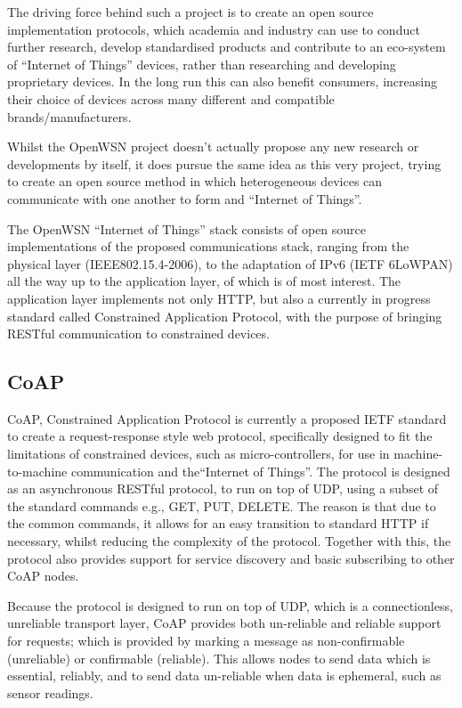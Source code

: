 The driving force behind such a project is to create an open source implementation protocols, which academia and industry can use to conduct further research, develop standardised products and contribute to an eco-system of ``Internet of Things'' devices, rather than researching and developing proprietary devices. In the long run this can also benefit consumers, increasing their choice of devices across many different and compatible brands/manufacturers.

Whilst the OpenWSN project doesn't actually propose any new research or developments by itself, it does pursue the same idea as this very project, trying to create an open source method in which heterogeneous devices can communicate with one another to form and ``Internet of Things''.

The OpenWSN ``Internet of Things'' stack consists of open source implementations of the proposed communications stack, ranging from the physical layer (IEEE802.15.4-2006), to the adaptation of IPv6 (IETF 6LoWPAN) all the way up to the application layer, of which is of most interest. The application layer implements not only HTTP, but also a currently in progress standard called Constrained Application Protocol, with the purpose of bringing RESTful communication to constrained devices.



\subsection{CoAP} %
\label{sub:coap}
CoAP, Constrained Application Protocol is currently a proposed IETF standard to create a request-response style web protocol, specifically designed to fit the limitations of constrained devices, such as micro-controllers, for use in machine-to-machine communication and the``Internet of Things''. The protocol is designed as an asynchronous RESTful protocol, to run on top of UDP, using a subset of the standard commands e.g., GET, PUT, DELETE. The reason is that due to the common commands, it allows for an easy transition to standard HTTP if necessary, whilst reducing the complexity of the protocol. Together with this, the protocol also provides support for service discovery and basic subscribing to other CoAP nodes.

Because the protocol is designed to run on top of UDP, which is a connectionless, unreliable transport layer, CoAP provides both un-reliable and reliable support for requests; which is provided by marking a message as non-confirmable (unreliable) or confirmable (reliable). This allows nodes to send data which is essential, reliably, and to send data un-reliable when data is ephemeral, such as sensor readings.   

